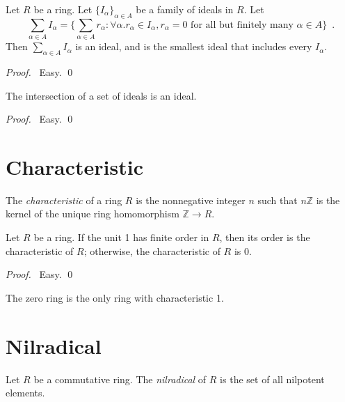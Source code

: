\begin{prop}
Let $R$ be a ring. Let $\{I_\alpha\}_{\alpha \in A}$ be a family of ideals in $R$. Let
\[ \sum_{\alpha \in A} I_\alpha = \{ \sum_{\alpha \in A} r_\alpha : \forall \alpha. r_\alpha \in I_\alpha, r_\alpha = 0 \text{ for all but finitely many } \alpha \in A \}\enspace . \]
Then $\sum_{\alpha \in A} I_\alpha$ is an ideal, and is the smallest ideal that includes every $I_\alpha$.
\end{prop}

\begin{proof}
\pf\ Easy. \qed
\end{proof}

\begin{prop}
The intersection of a set of ideals is an ideal.
\end{prop}

\begin{proof}
\pf\ Easy. \qed
\end{proof}

\section{Characteristic}

\begin{df}[Characteristic]
The \emph{characteristic} of a ring $R$ is the nonnegative integer $n$ such that $n \mathbb{Z}$ is the kernel of the unique ring homomorphism $\mathbb{Z} \rightarrow R$.
\end{df}

\begin{prop}
Let $R$ be a ring.
If the unit 1 has finite order in $R$, then its order is the characteristic of $R$; otherwise, the characteristic of $R$ is 0.
\end{prop}

\begin{proof}
\pf\ Easy. \qed
\end{proof}

\begin{ex}
The zero ring is the only ring with characteristic 1.
\end{ex}

\section{Nilradical}

\begin{df}[Nilradical]
Let $R$ be a commutative ring. The \emph{nilradical} of $R$ is the set of all nilpotent elements.
\end{df}

